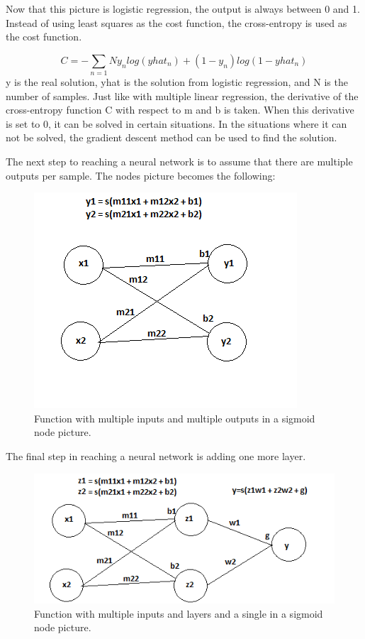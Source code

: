 \documentclass[12pt, oneside]{book}
\begin{document}
Now that this picture is logistic regression, the output is always between 0 and 1. Instead of using least squares as the cost function, the cross-entropy is used as the cost function. \cite{lazyprogrammer.me_data_nodate-2}

\begin{equation}
C=-\sum_{n=1}{N}y_{n}log(yhat_{n})+(1-y_{n})log(1-yhat_{n})
\end{equation}
y is the real solution, yhat is the solution from logistic regression, and  N is the number of samples. Just like with multiple linear regression, the derivative of the cross-entropy function C with respect to m and b is taken. When this derivative is set to 0, it can be solved in certain situations. In the situations where it can not be solved, the gradient descent method can be used to find the solution. \cite{lazyprogrammer.me_data_nodate-2}

The next step to reaching a neural network is to assume that there are multiple outputs per sample. The nodes picture becomes the following:
\begin{figure}[H]
	\centering
	\includegraphics[]{ANNsigNodes.png}
	\caption{Function with multiple inputs and multiple outputs in a sigmoid node picture.}
	\label{fig:ANNsigNode}
\end{figure}

The final step in reaching a neural network is adding one more layer.

\begin{figure}[H]
	\centering
	\includegraphics[]{ANNNodes.png}
	\caption{Function with multiple inputs and layers and a single in a sigmoid node picture.}
	\label{fig:ANNNode}
\end{figure}
\end{document}
